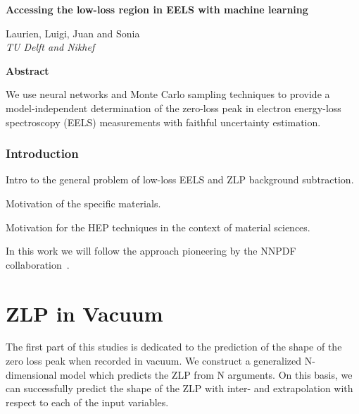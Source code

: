 \documentclass[11pt,a4paper]{article}
\numberwithin{equation}{section}
\numberwithin{figure}{section}
\numberwithin{table}{section}
\begin{document}

\vspace{2cm}

\begin{center}
  {\Large \bf
  Accessing the low-loss region in EELS with machine learning
  }
\vspace{1.4cm}


 Laurien, Luigi, Juan and Sonia\\


\vspace{0.4cm}
       {\it TU Delft and Nikhef
       }

       \vspace{1.0cm}

       {\bf \large Abstract}
       
\end{center}

We use neural networks and Monte Carlo sampling techniques
to provide a model-independent determination of the zero-loss peak
in electron energy-loss spectroscopy (EELS) measurements with faithful uncertainty estimation.

\tableofcontents

\section{Introduction}

\cite{AbdulKhalek:2019bux}

Intro to the general problem of low-loss EELS and ZLP background subtraction.

Motivation of the specific materials.

Motivation for the HEP techniques in the context of material sciences.

In this work we will follow the approach pioneering by the NNPDF collaboration~\cite{Ball:2017nwa}.

\part{ZLP in Vacuum}

The first part of this studies is dedicated to the prediction of the shape of the zero loss peak when recorded in vacuum. We construct a generalized N-dimensional model which predicts the ZLP from N arguments. On this basis, we can successfully predict the shape of the ZLP with inter- and extrapolation with respect to each of the input variables. \\
\end{document}

